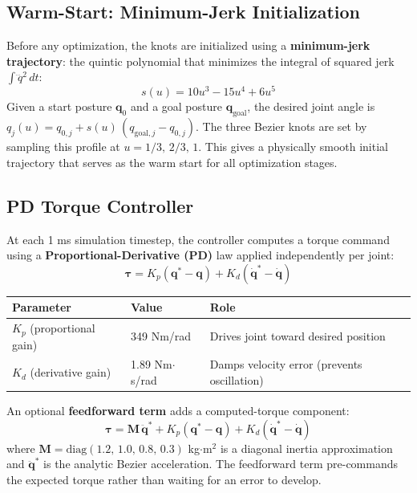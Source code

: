 \documentclass[11pt,letterpaper]{article}
\newcommand{\bq}{\bm{q}}
\newcommand{\bqdot}{\dot{\bm{q}}}
\newcommand{\bqdotdes}{\dot{\bm{q}}^*}
\newcommand{\bqdes}{\bm{q}^*}
\newcommand{\btau}{\bm{\tau}}
\begin{document}
\subsection{Warm-Start: Minimum-Jerk Initialization}

Before any optimization, the knots are initialized using a \textbf{minimum-jerk trajectory}: the quintic polynomial that minimizes the integral of squared jerk $\int \dddot{q}^2 \, dt$:
\begin{equation}
  s(u) = 10u^3 - 15u^4 + 6u^5
\end{equation}
Given a start posture $\bq_0$ and a goal posture $\bq_{\text{goal}}$, the desired joint angle is $q_j(u) = q_{0,j} + s(u)\,(q_{\text{goal},j} - q_{0,j})$. The three Bezier knots are set by sampling this profile at $u = 1/3,\, 2/3,\, 1$. This gives a physically smooth initial trajectory that serves as the warm start for all optimization stages.

\subsection{PD Torque Controller}

At each 1 ms simulation timestep, the controller computes a torque command using a \textbf{Proportional-Derivative (PD)} law applied independently per joint:
\begin{equation}
  \btau = K_p \left(\bqdes - \bq\right) + K_d \left(\bqdotdes - \bqdot\right)
  \label{eq:pd}
\end{equation}

\begin{center}
\begin{tabular}{lll}
\toprule
Parameter & Value & Role \\
\midrule
$K_p$ (proportional gain) & 349 Nm/rad & Drives joint toward desired position \\
$K_d$ (derivative gain) & 1.89 Nm$\cdot$s/rad & Damps velocity error (prevents oscillation) \\
\bottomrule
\end{tabular}
\end{center}

An optional \textbf{feedforward term} adds a computed-torque component:
\begin{equation}
  \btau = \mathbf{M}\,\ddot{\bq}^* + K_p(\bqdes - \bq) + K_d(\bqdotdes - \bqdot)
\end{equation}
where $\mathbf{M} = \mathrm{diag}(1.2,\,1.0,\,0.8,\,0.3)$ kg$\cdot$m$^2$ is a diagonal inertia approximation and $\ddot{\bq}^*$ is the analytic Bezier acceleration. The feedforward term pre-commands the expected torque rather than waiting for an error to develop.
\end{document}
